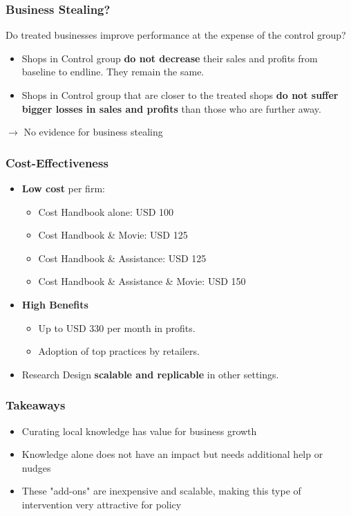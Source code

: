 \documentclass[10pt]{beamer}
\begin{document}
\begin{frame}
\frametitle{Business Stealing?}
Do treated businesses improve performance at the expense of the control group?
\vspace{0.1in}
\begin{itemize}
\item Shops in Control group \textbf{do not decrease} their sales and profits from baseline to endline. They remain the same.
\vspace{0.1in}
\item Shops in Control group that are closer to the treated shops \textbf{do not suffer bigger losses in sales and profits} than those who are further away.
\end{itemize}
\vspace{0.2in}
$\rightarrow$ \textcolor[rgb]{0.00,0.07,1.00}{No evidence for business stealing}
\end{frame}

\begin{frame}
\frametitle{Cost-Effectiveness}
\begin{itemize}
\item \textbf{Low cost} per firm:
\begin{itemize}
\item Cost Handbook alone: USD 100
\item Cost Handbook \& Movie: USD 125
\item Cost Handbook \& Assistance: USD 125
\item Cost Handbook \& Assistance \& Movie: USD 150
\vspace{0.20in}
\end{itemize}
\item \textbf{High Benefits}
    \begin{itemize}
    \item Up to USD 330 per month in profits.
    \item Adoption of top practices by retailers.
    \end{itemize}
\vspace{0.20in}
 \item Research Design \textbf{scalable and replicable} in other settings.
\end{itemize}
\end{frame}


\begin{frame}
\frametitle{Takeaways}
\begin{itemize}
    \item Curating local knowledge has value for business growth 
            \vspace{0.20in}
    \item Knowledge alone does not have an impact but needs additional help or nudges
            \vspace{0.20in}
	\item These "add-ons" are inexpensive and scalable, making this type of intervention very attractive for policy
    
\end{itemize}
\end{frame}
\end{document}
